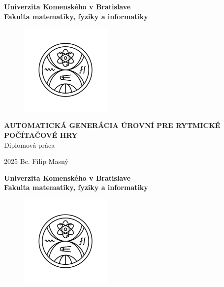 \documentclass[12pt, oneside]{book}  %
\def\mfrok{2025}
\def\mftitle{Automatická Generácia Úrovní pre Rytmické Počítačové Hry}
\def\mfthesistype{Diplomová práca}
\def\mfauthor{Bc. Filip Masný}
\def\mfuniversity{Univerzita Komenského v Bratislave }
\def\mffaculty{Fakulta matematiky, fyziky a informatiky}
\begin{document}
\frontmatter


\thispagestyle{empty}

\noindent
\begin{minipage}{\textwidth}
    \begin{center}
        \textbf{\mfuniversity \\
            \mffaculty}
    \end{center}
\end{minipage}

\vfill
\begin{figure}[!hbt]
    \begin{center}
        \includegraphics[width=0.4\textwidth]{images/FMFI_logo_BP.png}\label{img:logo}
    \end{center}
\end{figure}
\begin{center}
    \textbf{\MakeUppercase{\Large\mftitle}}\\
    \mfthesistype
\end{center}
\vfill
\mfrok \hfill
\mfauthor
\cleardoublepage



\thispagestyle{empty}
\noindent
\begin{minipage}{\textwidth}
    \begin{center}
        \textbf{\mfuniversity \\
            \mffaculty}
    \end{center}
\end{minipage}

\vfill
\begin{figure}[!hbt]
    \begin{center}
        \includegraphics[width=0.4\textwidth]{images/FMFI_logo_BP.png}\label{img:logo_dark}
    \end{center}
\end{figure}
\end{document}
